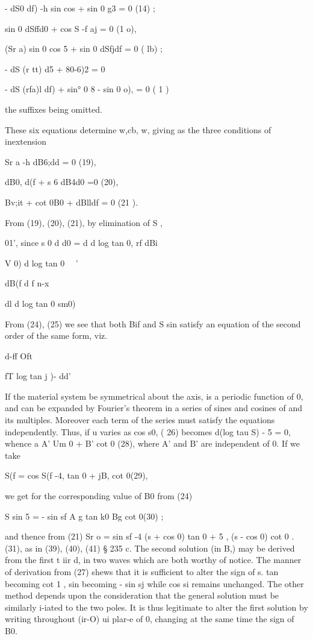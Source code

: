 - dS0 df) -h sin cos  + sin 0 g3 = 0 (14) ;

sin 0 dSffd0 + cos  S -f aj = 0 (1 o),

(Sr a) sin 0 cos 5 + sin 0 dSfjdf = 0 ( lb) ;

- dS (r tt) d5 + 80-6)2 = 0

- dS (rfa)l df) + sin° 0 8 - sin 0 o), = 0 ( 1 )

the suffixes being omitted.

These six equations determine w,cb, w,
giving as the three conditions of inextension

Sr a -h dB6;dd = 0 (19),

dB0, d(f + s 6 dB4d0 =0 (20),

Bv;it + cot 0B0 + dBlldf = 0 (21 ).

From (19), (20), (21), by elimination of S ,



01', since s 0 d d0 = d d log tan 0, rf   dBi

V  0)  d log tan 0~~ '

dB(f  d  f n-x

dl d log tan 0 sm0)

From (24), (25) we see that both Bif and S sin satisfy an equation of the
second order of the same form, viz.

d-ff Oft

fT log tan j )-  dd'

If the material system be symmetrical about the axis,  is a periodic function
of 0, and can be expanded by Fourier's theorem in a series of sines and
cosines of  and its multiples. Moreover each term of the series must satisfy
the equations independently.  Thus, if u varies as cos s0, ( 26) becomes d(log
tau S) - 5  = 0, whence a A' Um  0 + B' cot  0 (28),
where A' and B' are independent of 0. If we take

S(f = cos S(f -4, tan  0 + jB, cot  0(29),

we get for the corresponding value of B0 from (24)

S sin 5 = - sin sf A g tan k0 Bg cot  0(30) ;

and thence from (21) Sr o = sin sf -4 (s + cos 0) tan  0 + 5 , (s - cos 0) cot
0 .(31), as in (39), (40), (41) § 235 c.  The second solution (in B,) may be
derived from the first t iir d, in two waves which are both worthy of
notice. The manner of derivation from (27) shews that it is sufficient to
alter the sign of s.  tan becoming cot 1 , sin becoming - sin sj while cos si
remains unchanged.  The other method depends upon the consideration that the
general solution must be similarly i-iated to the two poles. It is thus
legitimate to alter the first solution by writing throughout (ir-O) ui plar-e
of 0, changing at the same time the sign of B0.

